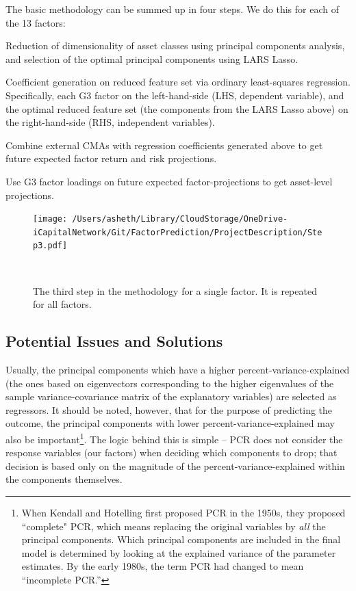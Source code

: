 \documentclass{ledger}
\begin{document}
The basic methodology can be summed up in four steps. We do this for each of the 13 factors:
\begin{compactenum}
	\item Reduction of dimensionality of asset classes using principal components analysis, and selection of the optimal principal components using LARS Lasso. 
	\item Coefficient generation on reduced feature set via ordinary least-squares regression. Specifically, each G3 factor on the left-hand-side (LHS, dependent variable), and the optimal reduced feature set (the components from the LARS Lasso above) on the right-hand-side (RHS, independent variables). 
	\item Combine external CMAs with regression coefficients generated above to get future expected factor return and risk projections.  
	\item Use G3 factor loadings on future expected factor-projections to get asset-level projections. \\
\end{compactenum}

\begin{figure}[!ht]
\centering
	\texttt{[image: /Users/asheth/Library/CloudStorage/OneDrive-iCapitalNetwork/Git/FactorPrediction/ProjectDescription/Step3.pdf]}
	\caption{The third step in the methodology for a single factor. It is repeated for all factors.} ~\\
\end{figure}

\subsection{Potential Issues and Solutions}

Usually, the principal components which have a higher percent-variance-explained (the ones based on eigenvectors corresponding to the higher eigenvalues of the sample variance-covariance matrix of the explanatory variables) are selected as regressors. It should be noted, however, that for the purpose of predicting the outcome, the principal components with lower percent-variance-explained may also be important\footnote{When Kendall and Hotelling first proposed PCR in the 1950s, they proposed ``complete" PCR, which means replacing the original variables by \textit{all} the principal components. Which principal components are included in the final model is determined by looking at the explained variance of the parameter estimates. By the early 1980s, the term PCR had changed to mean ``incomplete PCR.''}. The logic behind this is simple -- PCR does not consider the response variables (our factors) when deciding which components to drop; that decision is based only on the magnitude of the percent-variance-explained within the components themselves.\\
\end{document}
